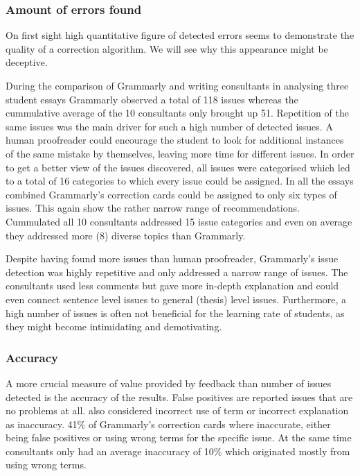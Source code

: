 \documentclass[runningheads]{llncs}
\begin{document}
\subsubsection{Amount of errors found}
On first sight high quantitative figure of detected errors seems to demonstrate the quality of a correction algorithm. We will see why this appearance might be deceptive.

During the comparison of Grammarly and writing consultants in analysing three student essays \textcite{dembsey_closing_2017} Grammarly observed a total of 118 issues whereas the cummulative average of the 10 consultants only brought up 51. Repetition of the same issues was the main driver for such a high number of detected issues. A human proofreader could encourage the student to look for additional instances of the same mistake by themselves, leaving more time for different issues. In order to get a better view of the issues discovered, all issues were categorised which led to a total of 16 categories to which every issue could be assigned. In all the essays combined Grammarly's correction cards could be assigned to only six types of issues. This again show the rather narrow range of recommendations. Cummulated all 10 consultants addressed 15 issue categories and even on average they addressed more (8) diverse topics than Grammarly.

Despite having found more issues than human proofreader, Grammarly's issue detection was highly repetitive and only addressed a narrow range of issues. The consultants used less comments but gave more in-depth explanation and could even connect sentence level issues to general (thesis) level issues. Furthermore, a high number of issues is often not beneficial for the learning rate of students, as they might become intimidating and demotivating. 
\citep{dembsey_closing_2017}


\subsubsection{Accuracy}
A more crucial measure of value provided by feedback than number of issues detected is the accuracy of the results. False positives are reported issues that are no problems at all. \textcite{dembsey_closing_2017} also considered incorrect use of term or incorrect explanation as inaccuracy. 41\% of Grammarly's correction cards where inaccurate, either being false positives or using wrong terms for the specific issue. At the same time consultants only had an average inaccuracy of 10\% which originated mostly from using wrong terms.
\citep{dembsey_closing_2017}
\end{document}
